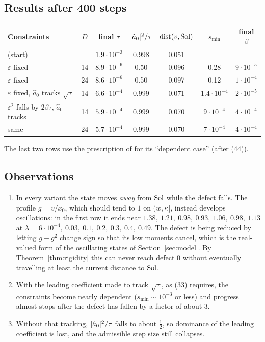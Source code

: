 \subsection*{Results after 400 steps}
\begin{center}
\small
\begin{tabular}{@{}p{}cccccc@{}}
\toprule
Constraints & $D$ & final $\tau$ & $\lvert \hat a_0\rvert^2/\tau$ & $\operatorname{dist}(v,\operatorname{Sol})$ & $s_{\min}$ & final $\beta$\\
\midrule
(start) & & $1.9\cdot10^{-3}$ & 0.998 & 0.051 & & \\
$\varepsilon$ fixed & 14 & $8.9\cdot10^{-6}$ & 0.50 & 0.096 & 0.28 & $9\cdot10^{-5}$\\
$\varepsilon$ fixed & 24 & $8.6\cdot10^{-6}$ & 0.50 & 0.097 & 0.12 & $1\cdot10^{-4}$\\
$\varepsilon$ fixed, $\hat a_0$ tracks $\sqrt\tau$ & 14 & $6.6\cdot10^{-4}$ & 0.999 & 0.071 & $1.4\cdot10^{-4}$ & $2\cdot10^{-5}$\\
$\varepsilon^2$ falls by $2\beta\tau$, $\hat a_0$ tracks & 14 & $5.9\cdot10^{-4}$ & 0.999 & 0.070 & $9\cdot10^{-4}$ & $4\cdot10^{-4}$\\
same & 24 & $5.7\cdot10^{-4}$ & 0.999 & 0.070 & $7\cdot10^{-4}$ & $4\cdot10^{-4}$\\
\bottomrule
\end{tabular}
\end{center}
The last two rows use the prescription of \paper{} for its ``dependent case'' (after (44)).

\subsection*{Observations}
\begin{enumerate}
\item In every variant the state moves \emph{away} from $\operatorname{Sol}$ while the defect falls. The
profile $g=v/x_0$, which should tend to $1$ on $(w,\kappa]$, instead develops oscillations: in
the first row it ends near $1.38,\ 1.21,\ 0.98,\ 0.93,\ 1.06,\ 0.98,\ 1.13$ at
$\lambda=6\cdot10^{-4},\ 0.03,\ 0.1,\ 0.2,\ 0.3,\ 0.4,\ 0.49$. The defect is being reduced by
letting $g-g^2$ change sign so that its low moments cancel, which is the real-valued form of the
oscillating states of Section~\ref{sec:model}. By Theorem~\ref{thm:rigidity} this can never
reach defect $0$ without eventually travelling at least the current distance to $\operatorname{Sol}$.
\item With the leading coefficient made to track $\sqrt\tau$, as \paper{} (33) requires, the
constraints become nearly dependent ($s_{\min}\sim10^{-3}$ or less) and progress almost stops
after the defect has fallen by a factor of about $3$.
\item Without that tracking, $\lvert \hat a_0\rvert^2/\tau$ falls to about $\frac12$, so dominance of
the leading coefficient is lost, and the admissible step size still collapses.
\end{enumerate}

